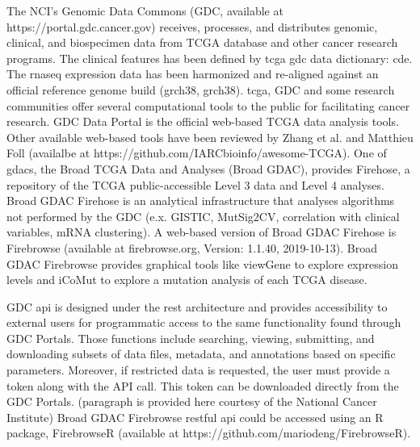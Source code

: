\documentclass[jpm,article,submit,moreauthors,pdftex]{Definitions/mdpi}
\begin{document}
The NCI's Genomic Data Commons (GDC, available at https://portal.gdc.cancer.gov) receives, processes, and distributes genomic, clinical, and biospecimen data from TCGA database and other cancer research programs. The clinical features has been defined by \acrshort{tcga} \acrshort{gdc} data dictionary: \acrfull{cde}\cite{CDE2019}. The \acrshort{rnaseq} expression data has been harmonized and re-aligned against an official reference genome build (\acrlong{grch38}, \acrshort{grch38}).
\acrshort{tcga}, GDC and some research communities offer several computational tools to the public for facilitating cancer research. %
GDC Data Portal is the official web-based TCGA data analysis tools. Other available web-based tools have been reviewed by Zhang et al.\cite{Zhang2019b} and 
Matthieu Foll (availalbe at https://github.com/IARCbioinfo/awesome-TCGA).
One of \acrshort{gdac}s, the Broad TCGA Data and Analyses (Broad GDAC), provides Firehose, a repository of the TCGA public-accessible Level 3 data and Level 4 analyses. Broad GDAC Firehose is an analytical infrastructure that analyses algorithms not performed by the GDC (e.x. GISTIC, MutSig2CV, correlation with clinical variables, mRNA clustering). 
A web-based version of Broad GDAC Firehose is Firebrowse (available at firebrowse.org, Version: 1.1.40, 2019-10-13).
Broad GDAC Firebrowse provides graphical tools like viewGene to explore expression levels and iCoMut to explore a mutation analysis of each TCGA disease. 


GDC \acrfull{api} is designed under the \acrfull{rest} architecture and provides accessibility to external users for programmatic access to the same functionality found through GDC Portals. Those functions include searching, viewing, submitting, and downloading subsets of data files, metadata, and annotations based on specific parameters. Moreover, if restricted data is requested, the user must provide a token along with the API call. This token can be downloaded directly from the GDC Portals. (paragraph is provided here courtesy of the National Cancer Institute)
Broad GDAC Firebrowse \acrshort{rest}ful \acrshort{api} could be accessed using an R package, FirebrowseR (available at https://github.com/mariodeng/FirebrowseR)\cite{Deng2017}.
\end{document}
